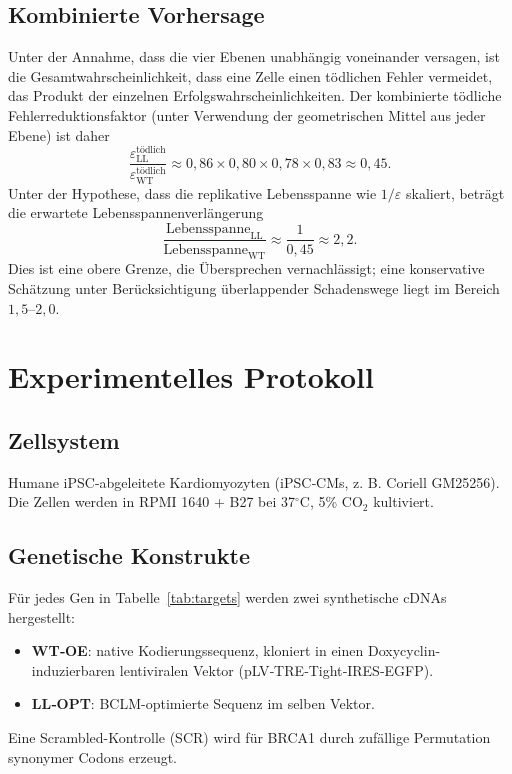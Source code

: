 \documentclass[12pt,a4paper]{article}
\begin{document}
	\subsection{Kombinierte Vorhersage}
	Unter der Annahme, dass die vier Ebenen unabhängig voneinander versagen, ist die Gesamtwahrscheinlichkeit, dass eine Zelle einen tödlichen Fehler vermeidet, das Produkt der einzelnen Erfolgswahrscheinlichkeiten. Der kombinierte tödliche Fehlerreduktionsfaktor (unter Verwendung der geometrischen Mittel aus jeder Ebene) ist daher
	\[
	\frac{\varepsilon_{\mathrm{LL}}^{\mathrm{tödlich}}}{\varepsilon_{\mathrm{WT}}^{\mathrm{tödlich}}} \approx 0,86 \times 0,80 \times 0,78 \times 0,83 \approx 0,45.
	\]
	Unter der Hypothese, dass die replikative Lebensspanne wie \(1/\varepsilon\) skaliert, beträgt die erwartete Lebensspannenverlängerung
	\[
	\frac{\mathrm{Lebensspanne}_{\mathrm{LL}}}{\mathrm{Lebensspanne}_{\mathrm{WT}}} \approx \frac{1}{0,45} \approx 2,2.
	\]
	Dies ist eine obere Grenze, die Übersprechen vernachlässigt; eine konservative Schätzung unter Berücksichtigung überlappender Schadenswege liegt im Bereich \(1,5\)–\(2,0\).
	
	\section{Experimentelles Protokoll}
	\label{sec:protocol}
	
	\subsection{Zellsystem}
	Humane iPSC-abgeleitete Kardiomyozyten (iPSC‑CMs, z. B. Coriell GM25256). Die Zellen werden in RPMI 1640 + B27 bei 37\(^\circ\)C, 5\% CO\(_2\) kultiviert.
	
	\subsection{Genetische Konstrukte}
	Für jedes Gen in Tabelle~\ref{tab:targets} werden zwei synthetische cDNAs hergestellt:
	\begin{itemize}
		\item \textbf{WT‑OE}: native Kodierungssequenz, kloniert in einen Doxycyclin-induzierbaren lentiviralen Vektor (pLV‑TRE‑Tight‑IRES‑EGFP).
		\item \textbf{LL‑OPT}: BCLM-optimierte Sequenz im selben Vektor.
	\end{itemize}
	Eine Scrambled-Kontrolle (SCR) wird für BRCA1 durch zufällige Permutation synonymer Codons erzeugt.
	
\end{document}
